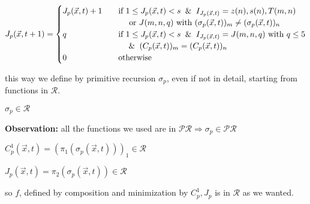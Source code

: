 \[
J_p(\vec{x}, t+1) = \begin{cases}
J_p(\vec{x}, t) + 1 & \quad \text{if } 1 \leq J_p(\vec{x}, t) < s \And I_{J_p(\vec{x}, t)} = z(n), s(n), T(m,n) \\
& \quad \quad \text{ or } J(m,n,q) \text{ with } (\sigma_p(\vec{x}, t))_m \neq (\sigma_p(\vec{x}, t))_n \\
q & \quad \text{if } 1 \leq J_p(\vec{x}, t) < s \And I_{J_p(\vec{x}, t)} = J(m,n,q) \text{ with } q\leq 5 \\
& \quad \quad \And (C_p(\vec{x}, t))_m = (C_p(\vec{x}, t))_n \\
0 & \quad \text{otherwise}
\end{cases}
\]

this way we define by primitive recursion $\sigma_p$, even if not in
detail, starting from functions in $\mathcal{R}$.

$\sigma_p \in \mathcal{R}$

\textbf{Observation:} all the functions we used are in  $\mathcal{PR} \Rightarrow \sigma_p \in \mathcal{PR}$

$C_p^1(\vec{x}, t) = (\pi_1(\sigma_p(\vec{x}, t)))_1 \in \mathcal{R}$

$J_p(\vec{x}, t) = \pi_2(\sigma_p(\vec{x}, t)) \in \mathcal{R}$

so $f$, defined by composition and minimization by $C_p^1, J_p$ is in $\mathcal{R}$ as we wanted.

\hfill \qedsymbol

